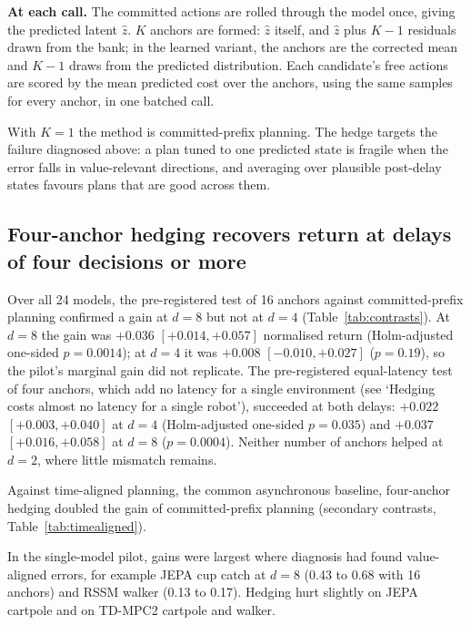 \documentclass[pdflatex,sn-nature]{sn-jnl}%
\begin{document}
\textbf{At each call.} The committed actions are rolled through the model once, giving the predicted latent $\hat z$. $K$ anchors are formed: $\hat z$ itself, and $\hat z$ plus $K-1$ residuals drawn from the bank; in the learned variant, the anchors are the corrected mean and $K-1$ draws from the predicted distribution. Each candidate's free actions are scored by the mean predicted cost over the anchors, using the same samples for every anchor, in one batched call.

With $K=1$ the method is committed-prefix planning. The hedge targets the failure diagnosed above: a plan tuned to one predicted state is fragile when the error falls in value-relevant directions, and averaging over plausible post-delay states favours plans that are good across them.

\subsection{Four-anchor hedging recovers return at delays of four decisions or more}\label{sec:closedloop}

Over all 24 models, the pre-registered test of 16 anchors against committed-prefix planning confirmed a gain at $d=8$ but not at $d=4$ (Table~\ref{tab:contrasts}). At $d=8$ the gain was $+0.036$ $[+0.014, +0.057]$ normalised return (Holm-adjusted one-sided $p=0.0014$); at $d=4$ it was $+0.008$ $[-0.010, +0.027]$ ($p=0.19$), so the pilot's marginal gain did not replicate. The pre-registered equal-latency test of four anchors, which add no latency for a single environment (see `Hedging costs almost no latency for a single robot'), succeeded at both delays: $+0.022$ $[+0.003, +0.040]$ at $d=4$ (Holm-adjusted one-sided $p=0.035$) and $+0.037$ $[+0.016, +0.058]$ at $d=8$ ($p=0.0004$). Neither number of anchors helped at $d=2$, where little mismatch remains.

Against time-aligned planning, the common asynchronous baseline, four-anchor hedging doubled the gain of committed-prefix planning (secondary contrasts, Table~\ref{tab:timealigned}).

In the single-model pilot, gains were largest where diagnosis had found value-aligned errors, for example JEPA cup catch at $d=8$ (0.43 to 0.68 with 16 anchors) and RSSM walker (0.13 to 0.17). Hedging hurt slightly on JEPA cartpole and on TD-MPC2 cartpole and walker.
\end{document}
